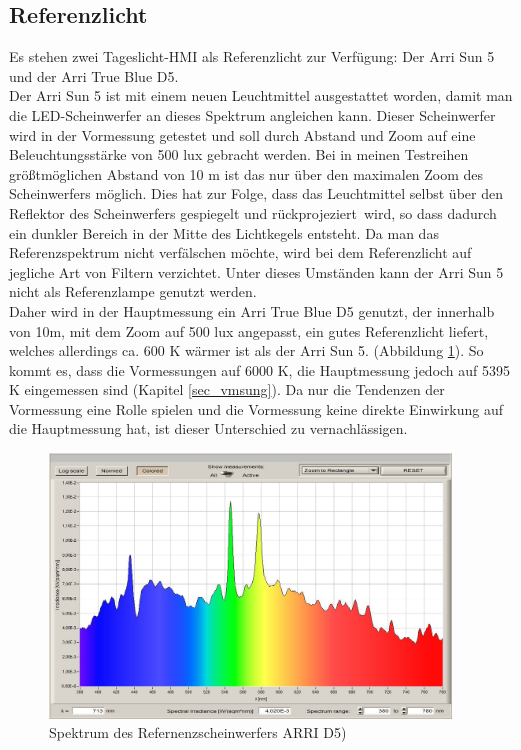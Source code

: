 
\subsection{Referenzlicht}
\label{sec_reflicht}
Es stehen zwei Tageslicht-HMI als Referenzlicht zur Verfügung: Der Arri Sun 5 und der Arri True Blue D5.\\
Der Arri Sun 5 ist mit einem neuen Leuchtmittel ausgestattet worden, damit man die LED-Scheinwerfer an dieses Spektrum angleichen kann. Dieser Scheinwerfer wird in der Vormessung getestet und soll durch Abstand und Zoom auf eine Beleuchtungsstärke von 500 lux gebracht werden. Bei in meinen Testreihen größtmöglichen Abstand von 10 m ist das nur über den maximalen Zoom des Scheinwerfers möglich. Dies hat zur Folge, dass das Leuchtmittel selbst über den Reflektor des Scheinwerfers gespiegelt und \glqq rückprojeziert\grqq\ wird, so dass dadurch ein dunkler Bereich in der Mitte des Lichtkegels entsteht. Da man das Referenzspektrum nicht verfälschen möchte, wird bei dem Referenzlicht auf jegliche Art von Filtern verzichtet. Unter dieses Umständen kann der Arri Sun 5 nicht als Referenzlampe genutzt werden.\\
Daher wird in der Hauptmessung ein Arri True Blue D5 genutzt, der innerhalb von 10m, mit dem Zoom auf 500 lux angepasst, ein gutes Referenzlicht liefert, welches allerdings ca. 600 K wärmer ist als der Arri Sun 5. (Abbildung \ref{b_ref}). So kommt es, dass die Vormessungen auf 6000 K, die Hauptmessung jedoch auf 5395 K eingemessen sind (Kapitel \ref{sec_vmsung}). Da nur die Tendenzen der Vormessung eine Rolle spielen und die Vormessung keine direkte Einwirkung auf die Hauptmessung hat, ist dieser Unterschied zu vernachlässigen.

\begin{figure}[H]     %
\centering
\includegraphics[width=0.95\textwidth]{bilder/ref} 
\caption {Spektrum des Refernenzscheinwerfers ARRI D5)}\label{b_ref}
\end{figure}

